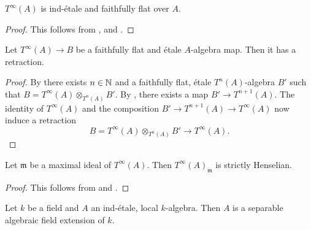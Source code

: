 \begin{lemma}
    $T^{\infty}(A)$ is ind-étale and faithfully flat over $A$.
    \label{lemma:etale-contraction-ind-etale}
\end{lemma}

\begin{proof}
    This follows from , 
    and .
\end{proof}

\begin{proposition}[{\stacksproject{097R}}]
    Let $T^{\infty}(A) \to B$ be a faithfully flat and étale $A$-algebra map. Then
    it has a retraction.
    \label{def:etale-contraction}
    \label{prop:etale-contraction-retraction}
\end{proposition}

\begin{proof}
    By 
    there exists $n \in \mathbb{N}$ and a faithfully flat, étale $T^n(A)$-algebra $B'$ such that
    $B = T^{\infty}(A) \otimes_{T^n(A)} B'$. By ,
    there exists a map $B' \to T^{n+1}(A)$. The identity of $T^{\infty}(A)$ and the composition
    $B' \to T^{n+1}(A) \to T^{\infty}(A)$ now induce a retraction
    \[
    B = T^{\infty}(A) \otimes_{T^n(A)} B' \to T^{\infty}(A)
    .\]
\end{proof}

\begin{corollary}
    Let $\mathfrak{m}$ be a maximal ideal of $T^{\infty}(A)$. Then $T^{\infty}(A)_{\mathfrak{m}}$
    is strictly Henselian.
    \label{cor:strictly-henselian-etale-contraction}
\end{corollary}

\begin{proof}
    This follows from  and .
\end{proof}

\begin{lemma}
    Let $k$ be a field and $A$ an ind-étale, local $k$-algebra. Then $A$ is
    a separable algebraic field extension of $k$.
    \label{lemma:field-local-indetale}
\end{lemma}

